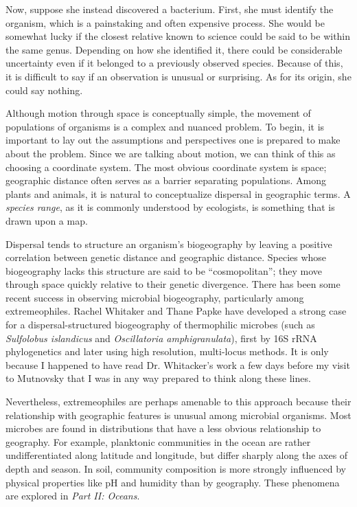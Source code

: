 Now, suppose she instead discovered a bacterium. First, she must identify the organism, which is a painstaking and often expensive process. She would be somewhat lucky if the closest relative known to science could be said to be within the same genus. Depending on how she identified it, there could be considerable uncertainty even if it belonged to a previously observed species. Because of this, it is difficult to say if an observation is unusual or surprising. As for its origin, she could say nothing.

Although motion through space is conceptually simple, the movement of populations of organisms is a complex and nuanced problem. To begin, it is important to lay out the assumptions and perspectives one is prepared to make about the problem. Since we are talking about motion, we can think of this as choosing a coordinate system. The most obvious coordinate system is space; geographic distance often serves as a barrier separating populations. Among plants and animals, it is natural to conceptualize dispersal in geographic terms. A {\em species range}, as it is commonly understood by ecologists, is something that is drawn upon a map. 

Dispersal tends to structure an organism's biogeography by leaving a positive correlation between genetic distance and geographic distance. Species whose biogeography lacks this structure are said to be ``cosmopolitan''; they move through space quickly relative to their genetic divergence. There has been some recent success in observing microbial biogeography, particularly among extremeophiles. Rachel Whitaker and Thane Papke have developed a strong case for a dispersal-structured biogeography of thermophilic microbes (such as {\em Sulfolobus islandicus} and {\em Oscillatoria amphigranulata}), first by 16S rRNA phylogenetics and later using high resolution, multi-locus methods. It is only because I happened to have read Dr. Whitacker's work a few days before my visit to Mutnovsky that I was in any way prepared to think along these lines.

Nevertheless, extremeophiles are perhaps amenable to this approach because their relationship with geographic features is unusual among microbial organisms. Most microbes are found in distributions that have a less obvious relationship to geography. For example, planktonic communities in the ocean are rather undifferentiated along latitude and longitude, but differ sharply along the axes of depth and season. In soil, community composition is more strongly influenced by physical properties like pH and humidity than by geography. These phenomena are explored in {\em Part II: Oceans}.

